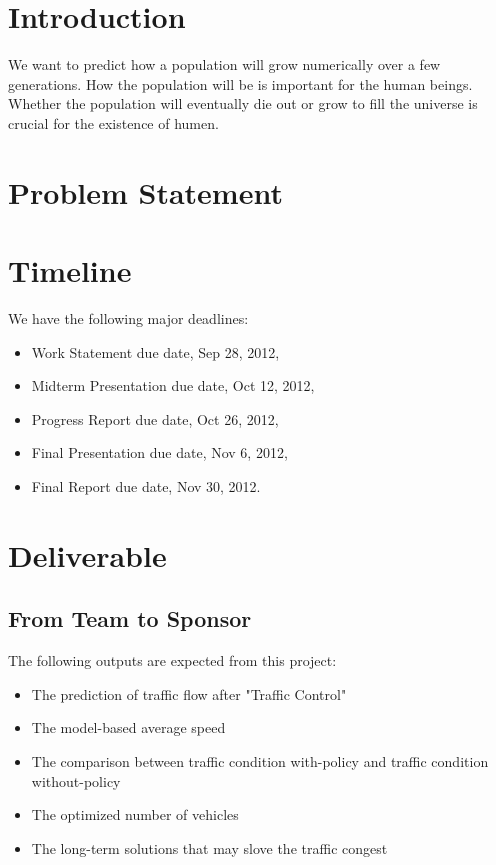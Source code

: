 \documentclass[12pt,letterpaper]{article}
\theoremstyle{definition}
\begin{document}
\def\shiftdowna{0.32in}  %
\def\shiftdownb{0.22in}  %


\section{Introduction} 
We want to predict how a population will grow numerically over a few generations. How the population will be is important for the human beings. Whether the population will eventually die out or grow to fill the universe is crucial for the existence of humen.

\section{Problem Statement}
  

  
\section{Timeline}
We have the following major deadlines:
\begin{itemize}
    \item Work Statement due date, Sep 28, 2012,
    \item Midterm Presentation due date, Oct 12, 2012,
    \item Progress Report due date, Oct 26, 2012,
    \item Final Presentation due date, Nov 6, 2012,
    \item Final Report due date, Nov 30, 2012.
\end{itemize}

\section{Deliverable}
\subsection{From Team to Sponsor} %
The following outputs are expected from this project:
\begin{itemize}
    \item The prediction of traffic flow after "Traffic Control" 
    \item The model-based average speed
    \item The comparison between traffic condition with-policy and traffic condition without-policy
    \item The optimized number of vehicles 
    \item The long-term solutions that may slove the traffic congest
\end{itemize}
\end{document}
